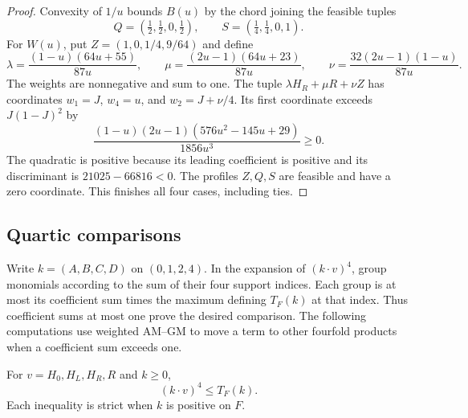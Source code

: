 \begin{proof}
Convexity of $1/u$ bounds $B(u)$ by the chord joining the feasible
tuples
\[
Q=(\tfrac12,\tfrac12,0,\tfrac12),\qquad
S=(\tfrac14,\tfrac14,0,1).
\]
For $W(u)$, put $Z=(1,0,1/4,9/64)$ and define
\begin{equation}\label{d-outer-weights}
\lambda=\frac{(1-u)(64u+55)}{87u},\qquad
\mu=\frac{(2u-1)(64u+23)}{87u},\qquad
\nu=\frac{32(2u-1)(1-u)}{87u}.
\end{equation}
The weights are nonnegative and sum to one. The tuple
$\lambda H_R+\mu R+\nu Z$ has coordinates $w_1=J$, $w_4=u$,
and $w_2=J+\nu/4$. Its first coordinate exceeds $J(1-J)^2$ by
\begin{equation}\label{d-outer-remainder}
\frac{(1-u)(2u-1)(576u^2-145u+29)}{1856u^3}\geq0.
\end{equation}
The quadratic is positive because its leading coefficient is positive
and its discriminant is $21025-66816<0$. The profiles $Z,Q,S$ are
feasible and have a zero coordinate. This finishes all four cases,
including ties.
\end{proof}

\subsection{Quartic comparisons}

Write $k=(A,B,C,D)$ on $(0,1,2,4)$. In the expansion of $(k\cdot v)^4$,
group monomials according to the sum of their four support indices.
Each group is at most its coefficient sum times the maximum defining
$T_F(k)$ at that index. Thus coefficient sums at most one prove the
desired comparison. The following computations use weighted AM--GM
to move a term to other fourfold products when a coefficient sum
exceeds one.

\begin{lemma}\label{d-half-comparisons}
For $v=H_0,H_L,H_R,R$ and $k\geq0$,
\begin{equation}\label{d-half-inequality}
(k\cdot v)^4\leq T_F(k).
\end{equation}
Each inequality is strict when $k$ is positive on $F$.
\end{lemma}

